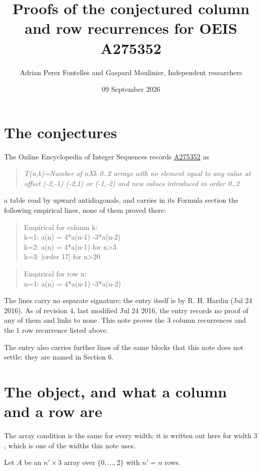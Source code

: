 \documentclass[11pt]{article}
\title{Proofs of the conjectured column and row recurrences for OEIS A275352}
\author{Adrian Perez Fontelles and Gaspard Moulinier, Independent researchers}
\date{09 September 2026}
\theoremstyle{definition}
\begin{document}
\maketitle
\section{The conjectures}

The Online Encyclopedia of Integer Sequences records \href{https://oeis.org/A275352}{A275352} as

\begin{quote}\itshape T(n,k)=Number of nXk 0..2 arrays with no element equal to any value at offset (-2,-1) (-2,1) or (-1,-2) and new values introduced in order 0..2\end{quote}

a table read by upward antidiagonals, and carries in its Formula section the following empirical lines, none of them proved there:

\begin{quote}\ttfamily Empirical for column k:\\
k=1: a(n) = 4*a(n-1) -3*a(n-2)\\k=2: a(n) = 4*a(n-1) for n>3\\k=3: [order 17] for n>20\end{quote}

\begin{quote}\ttfamily Empirical for row n:\\
n=1: a(n) = 4*a(n-1) -3*a(n-2)\end{quote}

The lines carry no separate signature; the entry itself is by R. H. Hardin (Jul 24 2016). As of revision 4, last modified Jul 24 2016, the entry records no proof of any of them and links to none. This note proves the 3 column recurrences and the 1 row recurrence listed above.

The entry also carries further lines of the same blocks that this note does not settle; they are named in Section 6.

\section{The object, and what a column and a row are}

The array condition is the same for every width; it is written out here for width $3$, which is one of the widths this note uses.

Let $A$ be an $n' \times 3$ array over $\{0,\dots,2\}$ with $n' = n$ rows.
\end{document}
